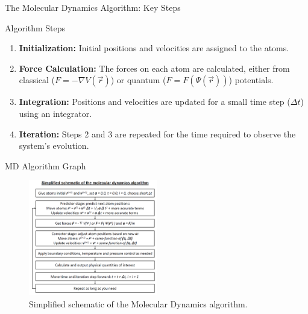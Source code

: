 
\begin{frame}{The Molecular Dynamics Algorithm: Key Steps}
    \begin{block}{Algorithm Steps}
        \begin{enumerate}
            \item \textbf{Initialization:} Initial positions and velocities are assigned to the atoms.
            \pause
            \item \textbf{Force Calculation:} The forces on each atom are calculated, either from classical ($F = -\nabla V(\vec{r})$) or quantum ($F = F(\Psi(\vec{r}))$) potentials.
            \pause
            \item \textbf{Integration:} Positions and velocities are updated for a small time step ($\Delta t$) using an integrator.
            \pause
            \item \textbf{Iteration:} Steps 2 and 3 are repeated for the time required to observe the system's evolution.
        \end{enumerate}
    \end{block}
\end{frame}


\begin{frame}{MD Algorithm Graph}
    \begin{figure}
        \includegraphics[width=0.5\textwidth]{images/algorithm.png}
        \caption{Simplified schematic of the Molecular Dynamics algorithm.}
    \end{figure}
\end{frame}